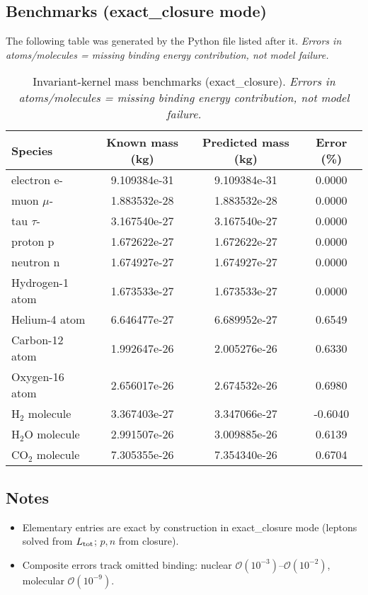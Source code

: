 \documentclass[11pt]{article}
\begin{document}
        \subsection{Benchmarks (exact\_closure mode)}
        \label{sec:benchmarks-exact-closure}
        The following table was generated by the Python file listed after it.
        \emph{Errors in atoms/molecules = missing binding energy contribution, not model failure.}

        \begin{table}[H]
        \centering
        \caption{Invariant-kernel mass benchmarks (exact\_closure). \emph{Errors in atoms/molecules = missing binding energy contribution, not model failure.}}
        \begin{tabular}{lccc}
        \toprule
        Species & Known mass (kg) & Predicted mass (kg) & Error (\%)\\
        \midrule
        electron e- & 9.109384e-31 & 9.109384e-31 & 0.0000\\
        muon $\mu$- & 1.883532e-28 & 1.883532e-28 & 0.0000\\
        tau $\tau$- & 3.167540e-27 & 3.167540e-27 & 0.0000\\
        proton p & 1.672622e-27 & 1.672622e-27 & 0.0000\\
        neutron n & 1.674927e-27 & 1.674927e-27 & 0.0000\\
        Hydrogen-1 atom & 1.673533e-27 & 1.673533e-27 & 0.0000\\
        Helium-4 atom & 6.646477e-27 & 6.689952e-27 & 0.6549\\
        Carbon-12 atom & 1.992647e-26 & 2.005276e-26 & 0.6330\\
        Oxygen-16 atom & 2.656017e-26 & 2.674532e-26 & 0.6980\\
        H$_2$ molecule & 3.367403e-27 & 3.347066e-27 & -0.6040\\
        H$_2$O molecule & 2.991507e-26 & 3.009885e-26 & 0.6139\\
        CO$_2$ molecule & 7.305355e-26 & 7.354340e-26 & 0.6704\\
        \bottomrule
        \end{tabular}\label{tab:benchmarks-exact-closure}
        \end{table}

        \subsection*{Notes}
        \begin{itemize}
        \item Elementary entries are exact by construction in exact\_closure mode (leptons solved from $L_{\rm tot}$; $p,n$ from closure).
        \item Composite errors track omitted binding: nuclear $\mathcal O(10^{-3})$–$\mathcal O(10^{-2})$, molecular $\mathcal O(10^{-9})$.
        \end{itemize}
\end{document}
